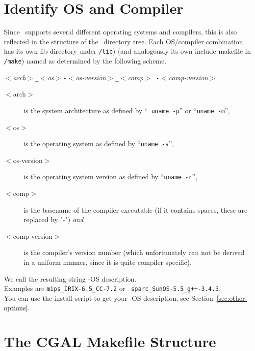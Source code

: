 
\section{Identify OS and Compiler\label{sec:os-compiler-id}}

Since \cgal\ supports several different operating systems and
compilers, this is also reflected in the structure of the \cgal\
directory tree. Each OS/compiler combination has its own lib directory
under \texttt{\cgaldir/lib}) (and analogously its own include
makefile in \texttt{\cgaldir/make}) named as
determined by the following scheme.
\begin{center}
  \textit{$<$arch$>$\texttt{\_}$<$os$>$\texttt{-}$<$os-version$>$\texttt{\_}$<$comp$>${\tt
    -}$<$comp-version$>$}
\end{center}

\begin{description}
\item[$<$arch$>$] is the system architecture as defined by ``{\tt
    uname -p}'' or ``\texttt{uname -m}'',
\item[$<$os$>$] is the operating system as defined by ``\texttt{uname
    -s}'',
\item[$<$os-version$>$] is the operating system version as defined by
  ``\texttt{uname -r}'',
\item[$<$comp$>$] is the basename of the compiler executable (if it
  contains spaces, these are replaced by "-") \textit{and}
\item[$<$comp-version$>$] is the compiler's version number (which
  unfortunately can not be derived in a uniform manner, since it is
  quite compiler specific).
\end{description}

We call the resulting string \cgal-OS description.\\ Examples are
\texttt{mips\_IRIX-6.5\_CC-7.2} or {\tt
  sparc\_SunOS-5.5\_g++-3.4.3}.\\ You can use the install script to
get your \cgal-OS description, see Section~\ref{sec:other-options}.

\section{The CGAL Makefile Structure\label{sec:makefiles}}

